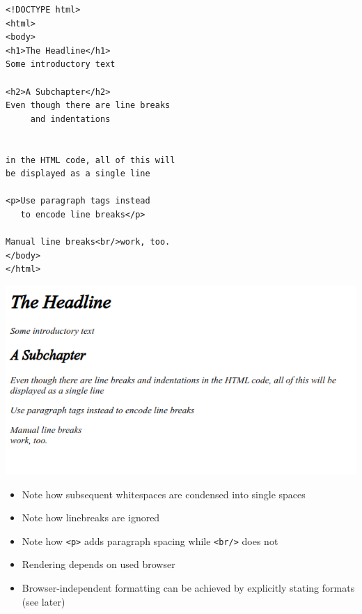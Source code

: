 \begin{frame}[fragile]
%
\begin{tcbraster}[raster columns=2,
                  raster equal height,
                  nobeforeafter,
                  raster column skip=0.1cm]
\begin{codebox}
\begin{verbatim}
<!DOCTYPE html>
<html>
<body>
<h1>The Headline</h1>
Some introductory text

<h2>A Subchapter</h2>
Even though there are line breaks
     and indentations


in the HTML code, all of this will
be displayed as a single line

<p>Use paragraph tags instead
   to encode line breaks</p>
   
Manual line breaks<br/>work, too.
</body>
</html>
\end{verbatim}
\end{codebox}
%
\begin{defbox}[Output]
\includegraphics[width=\linewidth]{./gfx/22-html-basic}

\scriptsize
\begin{itemize}
\item Note how subsequent whitespaces are condensed into single spaces
\item Note how linebreaks are ignored
\item Note how \texttt{<p>} adds paragraph spacing while \texttt{<br/>} does not
\item Rendering depends on used browser
\item Browser-independent formatting can be achieved by explicitly stating formats (see later)
\end{itemize}
\end{defbox}
\end{tcbraster}
%
\end{frame}

